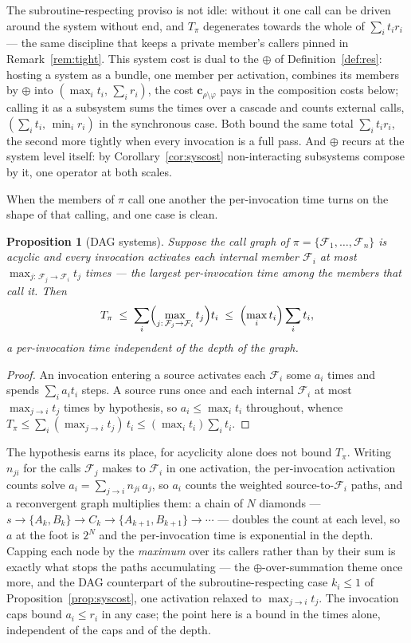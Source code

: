 \documentclass[11pt,a4paper]{article}
\newcommand{\F}{\mathcal{F}}
\newcommand{\bd}[1]{\mathbf{#1}}
\theoremstyle{accentdef}
\theoremstyle{accentplain}
\newtheorem{proposition}[definition]{Proposition}
\begin{document}
The subroutine-respecting proviso is not idle: without it one call can be driven around the system
without end, and $T_\pi$ degenerates towards the whole of $\sum_i t_i r_i$ --- the same discipline
that keeps a private member's callers pinned in Remark~\ref{rem:tight}. This system cost is dual to
the $\oplus$ of Definition~\ref{def:res}: hosting a system as a bundle, one member per activation,
combines its members by $\oplus$ into $(\max_i t_i,\, \sum_i r_i)$, the cost
$\bd{c}_{\rho \setminus \varphi}$ pays in the composition costs below; calling it as a subsystem
sums the times over a cascade and counts external calls, $(\sum_i t_i,\, \min_i r_i)$ in the
synchronous case. Both bound the same total $\sum_i t_i r_i$, the second more tightly when every
invocation is a full pass. And $\oplus$ recurs at the system level itself: by
Corollary~\ref{cor:syscost} non-interacting subsystems compose by it, one operator at both scales.

When the members of $\pi$ call one another the per-invocation time turns on the shape of that
calling, and one case is clean.

\begin{proposition}[DAG systems]\label{prop:dagcost}
Suppose the call graph of $\pi = \{\F_1,\ldots,\F_n\}$ is acyclic and every invocation activates
each internal member $\F_i$ at most $\max_{j:\,\F_j \to \F_i} t_j$ times --- the largest
per-invocation time among the members that call it. Then
\[
  T_\pi \;\le\; \sum_i \Bigl(\max_{j:\,\F_j \to \F_i} t_j\Bigr) t_i \;\le\; \Bigl(\max_i t_i\Bigr) \sum_i t_i ,
\]
a per-invocation time independent of the depth of the graph.
\end{proposition}

\begin{proof}
An invocation entering a source activates each $\F_i$ some $a_i$ times and spends $\sum_i a_i t_i$
steps. A source runs once and each internal $\F_i$ at most $\max_{j \to i} t_j$ times by hypothesis,
so $a_i \le \max_i t_i$ throughout, whence
$T_\pi \le \sum_i (\max_{j\to i} t_j)\, t_i \le (\max_i t_i) \sum_i t_i$.
\end{proof}

The hypothesis earns its place, for acyclicity alone does not bound $T_\pi$. Writing $n_{ji}$ for
the calls $\F_j$ makes to $\F_i$ in one activation, the per-invocation activation counts solve
$a_i = \sum_{j \to i} n_{ji}\, a_j$, so $a_i$ counts the weighted source-to-$\F_i$ paths, and a
reconvergent graph multiplies them: a chain of $N$ diamonds ---
$s \to \{A_k, B_k\} \to C_k \to \{A_{k+1}, B_{k+1}\} \to \cdots$ --- doubles the count at each
level, so $a$ at the foot is $2^N$ and the per-invocation time is exponential in the depth. Capping
each node by the \emph{maximum} over its callers rather than by their sum is exactly what stops the
paths accumulating --- the $\oplus$-over-summation theme once more, and the DAG counterpart of the
subroutine-respecting case $k_i \le 1$ of Proposition~\ref{prop:syscost}, one activation relaxed to
$\max_{j\to i} t_j$. The invocation caps bound $a_i \le r_i$ in any case; the point here is a bound
in the times alone, independent of the caps and of the depth.
\end{document}
